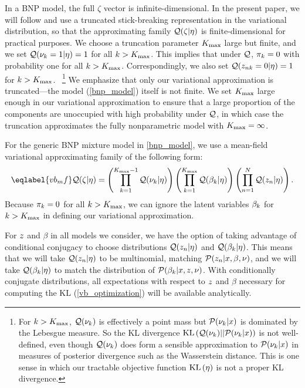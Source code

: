 In a BNP model, the full $\zeta$ vector is infinite-dimensional. In the present
paper, we will follow \citet{blei:2006:vi_for_dp} and use a truncated
stick-breaking representation in the variational distribution, so that the
approximating family $\mathcal{Q}(\zeta \vert \eta)$ is finite-dimensional for practical
purposes. We choose a truncation parameter ${K_{\mathrm{max}}}$ large but finite, and we set
$\mathcal{Q}(\nu_k = 1 | \eta) = 1$ for all $k > {K_{\mathrm{max}}}$. This implies that under $\mathcal{Q}$,
$\pi_k = 0$ with probability one for all $k > {K_{\mathrm{max}}}$. Correspondingly, we also
set $\mathcal{Q}(z_{nk} = 0 | \eta) = 1$ for $k > {K_{\mathrm{max}}}$.~
%
\footnote{For $k > {K_{\mathrm{max}}}$, $\mathcal{Q}(\nu_k)$ is effectively a point mass  but
$\mathcal{P}(\nu_k \vert x)$ is dominated by the Lebesgue measure.  So the KL
divergence $\mathrm{KL}\left(\mathcal{Q}(\nu_k) || \mathcal{P}(\nu_k \vert x)\right)$ is not well-defined, even
though $\mathcal{Q}(\nu_k)$ does form a sensible approximation to $\mathcal{P}(\nu_k \vert x)$
in measures of posterior divergence such as the Wasserstein distance.  This is
one sense in which our tractable objective function $\mathrm{KL}\left(\eta\right)$ is not a proper
KL divergence.}
%
We emphasize that only our variational approximation is truncated---the model
(\eqref{bnp_model}) itself is not finite. We set ${K_{\mathrm{max}}}$ large enough in our
variational approximation to ensure that a large proportion of the components
are unoccupied with high probability under $\mathcal{Q}$, in which case the truncation
approximates the fully nonparametric model with ${K_{\mathrm{max}}} = \infty$.

For the generic BNP mixture model in \eqref{bnp_model}, we use a mean-field
variational approximating family of the following form:
%
\begin{align}\eqlabel{vb_mf}
%
\q(\zeta \vert \eta) =
    \left( \prod_{\k=1}^{\kmax - 1} \q(\nuk \vert \eta) \right)
    \left( \prod_{\k=1}^{\kmax} \q(\beta_\k \vert \eta) \right)
    \left( \prod_{\n=1}^{\N} \q(\z_{\n} \vert \eta) \right).
%
\end{align}
%
Because $\pi_k = 0$ for all $k > {K_{\mathrm{max}}}$, we can ignore the latent variables
$\beta_k$ for $k > {K_{\mathrm{max}}}$ in defining our variational approximation.


For $z$ and $\beta$ in all models we consider, we have the option of taking
advantage of conditional conjugacy to choose distributions $\mathcal{Q}(z_n \vert
\eta)$ and $\mathcal{Q}(\beta_k \vert \eta)$. This means that we will take $\mathcal{Q}(z_n
\vert \eta)$ to be multinomial, matching $\mathcal{P}(z_{n} \vert x, \beta, \nu)$, and
we will take $\mathcal{Q}(\beta_k \vert \eta)$ to match the distribution of
$\mathcal{P}(\beta_{k} \vert x, z, \nu)$. With conditionally conjugate distributions,
all expectations with respect to $z$ and $\beta$ necessary for computing the
$\mathrm{KL}$ (\eqref{vb_optimization}) will be available analytically.

